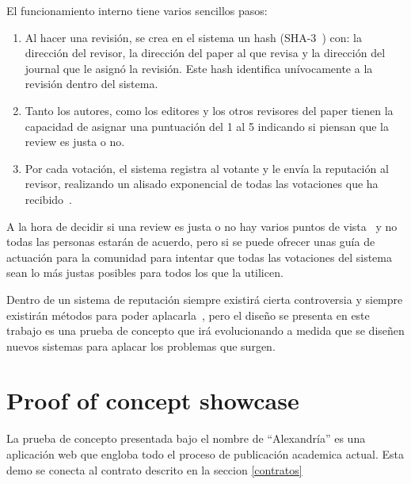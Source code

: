 El funcionamiento interno tiene varios sencillos pasos:
\begin{enumerate}
\item Al hacer una revisión, se crea en el sistema un hash
  (SHA-3~\cite{aumasson2008sha}) con: la dirección del revisor, la dirección del
  paper al que revisa y la dirección del journal que le asignó la revisión. Este
  hash identifica unívocamente a la revisión dentro del sistema.
\item Tanto los autores, como los editores y los otros revisores del paper
  tienen la capacidad de asignar una puntuación del 1 al 5 indicando si piensan
  que la review es justa o no.
\item Por cada votación, el sistema registra al votante y le envía la reputación
  al revisor, realizando un alisado exponencial de todas las votaciones que ha
  recibido~\cite{gardner1985exponential}.
\end{enumerate}

A la hora de decidir si una review es justa o no hay varios puntos de
vista~\cite{daniel1993guardians,cole1979fair} y no todas las personas estarán de
acuerdo, pero si se puede ofrecer unas guía de actuación para la comunidad para
intentar que todas las votaciones del sistema sean lo más justas posibles para
todos los que la utilicen.

Dentro de un sistema de reputación siempre existirá cierta controversia y
siempre existirán métodos para poder aplacarla~\cite{dellarocas2000immunizing},
pero el diseño se presenta en este trabajo es una prueba de concepto que irá
evolucionando a medida que se diseñen nuevos sistemas para aplacar los problemas
que surgen.

\section{Proof of concept showcase}
\label{poc}
La prueba de concepto presentada bajo el nombre de ``Alexandría'' es una
aplicación web que engloba todo el proceso de publicación academica actual. Esta
demo se conecta al contrato descrito en la seccion \ref{contratos}



